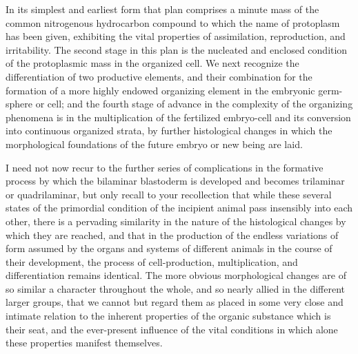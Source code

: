 \documentclass[a4paper, 11pt, oneside, english]{article}
\begin{document}
In its simplest and earliest form that plan comprises a minute mass of the common nitrogenous hydrocarbon compound to which the name of protoplasm has been given, exhibiting the vital properties of assimilation, reproduction, and irritability. The second stage in this plan is the nucleated and enclosed condition of the protoplasmic mass in the organized cell. We next recognize the differentiation of two productive elements, and their combination for the formation of a more highly endowed organizing element in the embryonic germ-sphere or cell; and the fourth stage of advance in the complexity of the organizing phenomena is in the multiplication of the fertilized embryo-cell and its conversion into continuous organized strata, by further histological changes in which the morphological foundations of the future embryo or new being are laid.

I need not now recur to the further series of complications in the formative process by which the bilaminar blastoderm is developed and becomes trilaminar or quadrilaminar, but only recall to your recollection that while these several states of the primordial condition of the incipient animal pass insensibly into each other, there is a pervading similarity in the nature of the histological changes by which they are reached, and that in the production of the endless variations of form assumed by the organs and systems of different animals in the course of their development, the process of cell-production, multiplication, and differentiation remains identical. The more obvious morphological changes are of so similar a character throughout the whole, and so nearly allied in the different larger groups, that we cannot but regard them as placed in some very close and intimate relation to the inherent properties of the organic substance which is their seat, and the ever-present influence of the vital conditions in which alone these properties manifest themselves.
\end{document}
